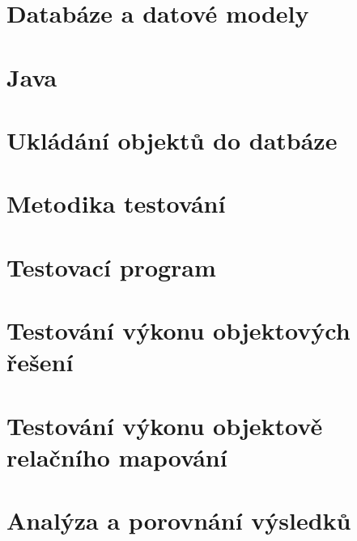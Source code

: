 \chapter{Databáze a datové modely}


\chapter{Java}


\chapter{Ukládání objektů do datbáze}


\chapter{Metodika testování}


\chapter{Testovací program}


\chapter{Testování výkonu objektových řešení}


\chapter{Testování výkonu objektově relačního mapování }


\chapter{Analýza a porovnání výsledků}

